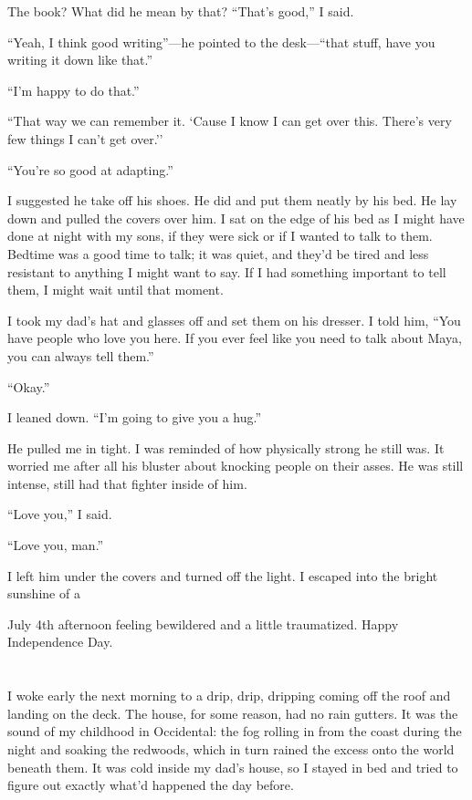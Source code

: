 \documentclass[12pt]{book}
\begin{document}
The book? What did he mean by that? ``That's good,'' I said.

``Yeah, I think good writing''---he pointed to the desk---``that stuff, have you writing it down like that.''

``I'm happy to do that.''

``That way we can remember it. `Cause I know I can get over this. There's very few things I can't get over.''

``You're so good at adapting.''

I suggested he take off his shoes. He did and put them neatly by his bed. He lay down and pulled the covers over him. I sat on the edge of his bed as I might have done at night with my sons, if they were sick or if I wanted to talk to them. Bedtime was a good time to talk; it was quiet, and they'd be tired and less resistant to anything I might want to say. If I had something important to tell them, I might wait until that moment.

I took my dad's hat and glasses off and set them on his dresser. I told him, ``You have people who love you here. If you ever feel like you need to talk about Maya, you can always tell them.''

``Okay.''

I leaned down. ``I'm going to give you a hug.''

He pulled me in tight. I was reminded of how physically strong he still was. It worried me after all his bluster about knocking people on their asses. He was still intense, still had that fighter inside of him.

``Love you,'' I said.

``Love you, man.''

I left him under the covers and turned off the light. I escaped into the bright sunshine of a

July 4th afternoon feeling bewildered and a little traumatized. Happy Independence Day. 


\chapter{}

I woke early the next morning to a drip, drip, dripping coming off the roof and landing on the deck. The house, for some reason, had no rain gutters. It was the sound of my childhood in Occidental: the fog rolling in from the coast during the night and soaking the redwoods, which in turn rained the excess onto the world beneath them. It was cold inside my dad's house, so I stayed in bed and tried to figure out exactly what'd happened the day before.
\end{document}
